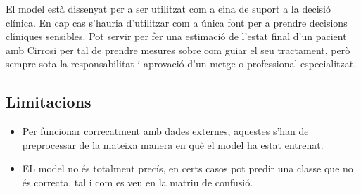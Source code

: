 El model està dissenyat per a ser utilitzat com a eina de suport a la decisió clínica. En cap cas s'hauria d'utilitzar com a única font per a prendre decisions clíniques sensibles. Pot servir per fer una estimació de l'estat final d'un pacient amb Cirrosi per tal de prendre mesures sobre com guiar el seu tractament, però sempre sota la responsabilitat i aprovació d'un metge o professional especialitzat.

\subsection{Limitacions}
\begin{itemize}
\item Per funcionar correcatment amb dades externes, aquestes s'han de preprocessar de la mateixa manera en què el model ha estat entrenat.
\item EL model no és totalment precís, en certs casos pot predir una classe que no és correcta, tal i com es veu en la matriu de confusió.
\end{itemize}

